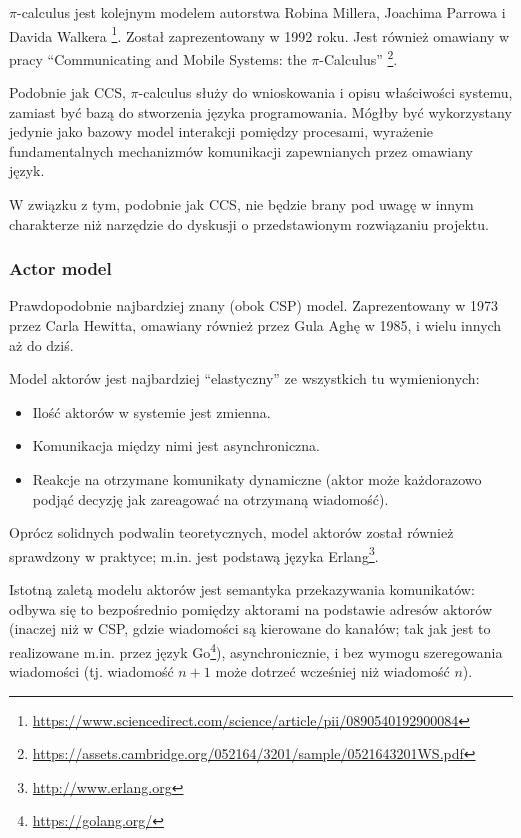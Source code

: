 \documentclass[11pt,oneside,a4paper,titlepage,onecolumn]{article}
\begin{document}
$\pi$-calculus jest kolejnym modelem autorstwa Robina Millera, Joachima Parrowa i Davida Walkera
\footnote{\url{https://www.sciencedirect.com/science/article/pii/0890540192900084}}.
Został zaprezentowany w 1992 roku.
Jest również omawiany w pracy ``Communicating and Mobile Systems: the $\pi$-Calculus''
\footnote{\url{https://assets.cambridge.org/052164/3201/sample/0521643201WS.pdf}}.

Podobnie jak CCS, $\pi$-calculus służy do wnioskowania i opisu właściwości systemu, zamiast być
bazą do stworzenia języka programowania. Mógłby być wykorzystany jedynie jako bazowy model interakcji
pomiędzy procesami, wyrażenie fundamentalnych mechanizmów komunikacji zapewnianych przez omawiany
język.

W związku z tym, podobnie jak CCS, nie będzie brany pod uwagę w innym charakterze niż narzędzie do
dyskusji o przedstawionym rozwiązaniu projektu.

\subsubsection{Actor model}

Prawdopodobnie najbardziej znany (obok CSP) model. Zaprezentowany w 1973 przez Carla Hewitta, omawiany
również przez Gula Aghę w 1985, i wielu innych aż do dziś.

Model aktorów jest najbardziej ``elastyczny'' ze wszystkich tu wymienionych:

\begin{itemize}
\item Ilość aktorów w systemie jest zmienna.
\item Komunikacja między nimi jest asynchroniczna.
\item Reakcje na otrzymane komunikaty dynamiczne (aktor może każdorazowo podjąć decyzję jak zareagować
    na otrzymaną wiadomość).
\end{itemize}

Oprócz solidnych podwalin teoretycznych, model aktorów został również sprawdzony w praktyce; m.in. jest
podstawą języka Erlang\footnote{\url{http://www.erlang.org}}.

Istotną zaletą modelu aktorów jest semantyka przekazywania komunikatów: odbywa się to bezpośrednio pomiędzy
aktorami na podstawie adresów aktorów (inaczej niż w CSP, gdzie wiadomości są kierowane do kanałów; tak jak
jest to realizowane m.in. przez język Go\footnote{\url{https://golang.org/}}), asynchronicznie, i
bez wymogu szeregowania wiadomości (tj. wiadomość $n+1$ może dotrzeć wcześniej niż wiadomość $n$).
\end{document}
